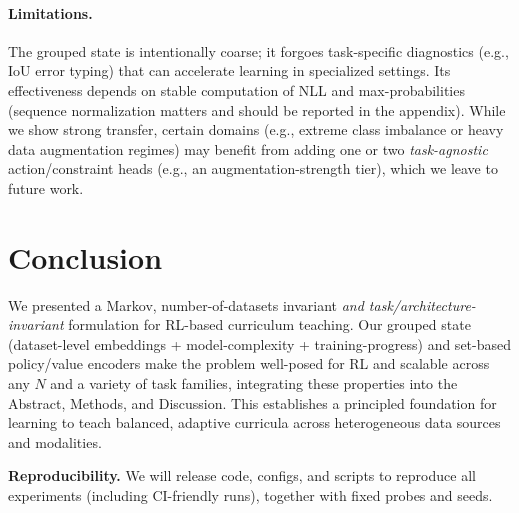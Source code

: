 \documentclass[11pt]{article}
\newcommand{\1}{\mathbf{1}}
\begin{document}
\paragraph{Limitations.}
The grouped state is intentionally coarse; it forgoes task-specific diagnostics (e.g., IoU error typing) that can accelerate learning in specialized settings.
Its effectiveness depends on stable computation of NLL and max-probabilities (sequence normalization matters and should be reported in the appendix).
While we show strong transfer, certain domains (e.g., extreme class imbalance or heavy data augmentation regimes) may benefit from adding one or two \emph{task-agnostic} action/constraint heads (e.g., an augmentation-strength tier), which we leave to future work.

\section{Conclusion}
We presented a Markov, number-of-datasets invariant \emph{and task/architecture-invariant} formulation for RL-based curriculum teaching.
Our grouped state (dataset-level embeddings + model-complexity + training-progress) and set-based policy/value encoders make the problem well-posed for RL and scalable across any $N$ and a variety of task families, integrating these properties into the Abstract, Methods, and Discussion.
This establishes a principled foundation for learning to teach balanced, adaptive curricula across heterogeneous data sources and modalities.

\medskip
\noindent\textbf{Reproducibility.}
We will release code, configs, and scripts to reproduce all experiments (including CI-friendly runs), together with fixed probes and seeds.
\end{document}

